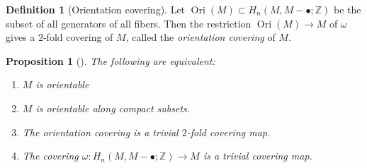 \documentclass[reqno]{amsart}
\newtheorem{proposition}[theorem]{Proposition}
\theoremstyle{definition}
\newtheorem{definition}[theorem]{Definition}
\theoremstyle{remark}
\DeclareMathOperator{\Ori}{Ori}
\begin{document}
\begin{definition}[Orientation covering]
    Let $\Ori(M) \subset H_n(M, M - \bullet; \mathbb{Z})$ be the
    subset of all generators of all fibers. Then
    the restriction
    $\Ori (M) \to M$ of $\omega$ gives a $2$-fold
    covering of $M$, called the
    \textit{orientation covering} of $M$.
\end{definition}

\begin{proposition}[]\label{Prop:UBCKW}
    The following are equivalent:


    \begin{enumerate}
        \item $M$ is orientable
        \item $M$ is orientable along compact subsets.
        \item The orientation covering is a trivial 
            $2$-fold covering map.
        \item The covering $\omega \colon
            H_n(M, M - \bullet ; \mathbb{Z}) \to M$ is
            a trivial covering map.
    \end{enumerate}

\end{proposition}
\end{document}

